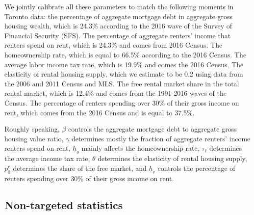\documentclass[parskip=full]{article}
\begin{document}
We jointly calibrate all these parameters to match the following moments in Toronto data: the percentage of aggregate mortgage debt in aggregate gross housing wealth, which is 24.3\% according to the 2016 wave of the Survey of Financial Security (SFS). The percentage of aggregate renters' income that renters spend on rent, which is 24.3\% and comes from 2016 Census. The homeownership rate, which is equal to 66.5\% according to the 2016 Census. The average labor income tax rate, which is 19.9\% and comes the 2016 Census. The elasticity of rental housing supply, which we estimate to be 0.2 using data from the 2006 and 2011 Census and MLS. The free rental market share in the total rental market, which is 12.4\% and comes from the 1991-2016 waves of the Census. The percentage of renters spending over 30\% of their gross income on rent, which comes from the 2016 Census and is equal to 37.5\%.

Roughly speaking, $\beta$ controls the aggregate mortgage debt to aggregate gross housing value ratio, $\gamma$ determines mostly the fraction of aggregate renters' income renters spend on rent, $\underline{h}_{o}$ mainly affects the homeownership rate, $\tau_{\ell}$ determines the average income tax rate, $\theta$ determines the elasticity of rental housing supply, $p^{r}_{0}$ determines the share of the free market, and $\underline{h}_{r}$ controls the percentage of renters spending over 30\% of their gross income on rent.

\subsection{Non-targeted statistics}\label{subsection:non_targeted_statistics}
\end{document}
